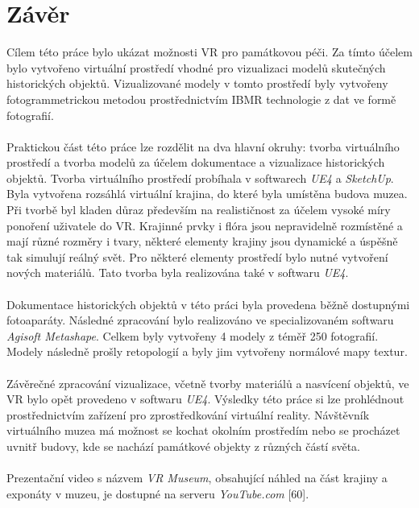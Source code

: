 \documentclass[a4paper, 12pt]{report}
\begin{document}
\chapter{Závěr}
Cílem této práce bylo ukázat možnosti VR pro památkovou péči. Za tímto účelem bylo vytvořeno virtuální prostředí vhodné pro vizualizaci modelů skutečných historických objektů. Vizualizované modely v tomto prostředí byly vytvořeny fotogrammetrickou metodou prostřednictvím IBMR technologie z dat ve formě fotografií.\\
\\
Praktickou část této práce lze rozdělit na dva hlavní okruhy: tvorba virtuálního prostředí a tvorba modelů za účelem dokumentace a vizualizace historických objektů. Tvorba virtuálního prostředí probíhala v softwarech \textit{UE4} a \textit{SketchUp}. Byla vytvořena rozsáhlá virtuální krajina, do které byla umístěna budova muzea. Při tvorbě byl kladen důraz především na realističnost za účelem vysoké míry ponoření uživatele do VR. Krajinné prvky i flóra jsou nepravidelně rozmístěné a mají různé rozměry i tvary, některé elementy krajiny jsou dynamické a úspěšně tak simulují reálný svět. Pro některé elementy prostředí bylo nutné vytvoření nových materiálů. Tato tvorba byla realizována také v softwaru \textit{UE4}.\\
\\
Dokumentace historických objektů v této práci byla provedena běžně dostupnými fotoaparáty. Následné zpracování bylo realizováno ve specializovaném softwaru \textit{Agisoft Metashape}. Celkem byly vytvořeny 4 modely z téměř 250 fotografií. Modely následně prošly retopologií a byly jim vytvořeny normálové mapy textur.\\
\\
Závěrečné zpracování vizualizace, včetně tvorby materiálů a nasvícení objektů, ve VR bylo opět provedeno v softwaru \textit{UE4}. Výsledky této práce si lze prohlédnout prostřednictvím zařízení pro zprostředkování virtuální reality. Návštěvník virtuálního muzea má možnost se kochat okolním prostředím nebo se procházet uvnitř budovy, kde se nachází památkové objekty z různých částí světa. \\
\\
Prezentační video s názvem \textit{VR Museum}, obsahující náhled na část krajiny a exponáty v muzeu, je dostupné na serveru \textit{YouTube.com} [60].



\newpage
\end{document}
